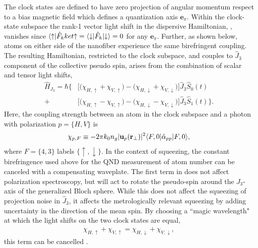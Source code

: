 \documentclass[preprint,aps,pra,onecolumn]{revtex4-1} %
\newcommand{\jz}{\hat{J}_3}
\begin{document}
The clock states are defined to have zero projection of angular momentum respect to a bias magnetic field which defines a quantization axis $\mathbf{e}_\pi$.  Within the clock-state subspace the rank-1 vector light shift in the dispersive Hamiltonian, , vanishes since $\langle{\uparrow}\rvert\hat{F}_k ket{\uparrow} =\langle{\downarrow}\rvert\hat{F}_k \lvert{\downarrow}\rangle = 0$ for any $\mathbf{e}_\pi$. Further, as shown below, atoms on either side of the nanofiber experience the same birefringent coupling. The resulting Hamiltonian, restricted to the clock subspace, and couples to $\hat{J}_3$ component of the collective pseudo spin, arises from the combination of scalar and tensor light shifts,
	\begin{align} \label{Eq::ClockHamiltonian}
		\hat{H}_{J_3} = \hbar \Big\{ & \big[ \big( \chi_{H,\uparrow} +\chi_{V,\uparrow} \big) - \big( \chi_{H,\downarrow} + \chi_{V,\downarrow}\big) \big] \jz \hat{S}_0(t) \\
		+ & \big[  \big( \chi_{H, \uparrow} - \chi_{V,\uparrow} \big) - \big(\chi_{H,\downarrow} - \chi_{V,\downarrow} \big) \big]  \jz \hat{S}_1(t) \Big\}. \nonumber
	\end{align}
Here, the coupling strength between an atom in the clock subspace and a photon with polarization $p = \{H,V\}$ is
	\begin{equation} \label{Eq::ClockCouplingStrength}
		\chi_{p,F} \equiv - 2\pi k_0 n_g  | \mathbf{u}_p(\mathbf{r}_\perp)|^2 \langle{F,0}\rvert\hat{\alpha}_{pp}  \lvert{F,0}\rangle,
	\end{equation}
where $F = \{4,3\}$ labels $\{\uparrow,\downarrow\}$. In the context of squeezing, the constant birefringence used above for the QND measurement of atom number can be canceled with a compensating waveplate. The first term in  does not affect polarization spectroscopy, but will act to rotate the pseudo-spin around the $J_3$-axis of the generalized Bloch sphere.  While this does not affect the squeezing of projection noise in $\hat{J}_3$, it affects the metrologically relevant squeezing by adding uncertainty in the direction of the mean spin.  By choosing a ``magic wavelength" at which the light shifts on the two clock states are equal, 
	\begin{align} \label{Eq::MagicWavelengthCondition}
		\chi_{H,\uparrow} +\chi_{V,\uparrow}  = \chi_{H,\downarrow} + \chi_{V,\downarrow},
	\end{align}
this term can be cancelled \cite{chaudhury_continuous_2006}. 
\end{document}
